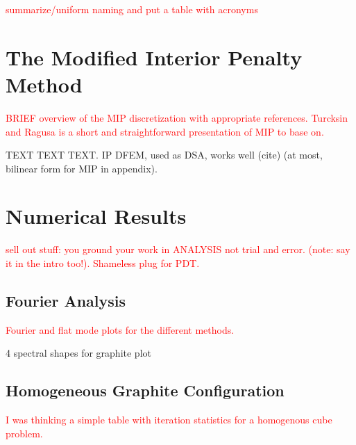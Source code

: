 \documentclass[preprint,10pt]{elsarticle}
\newcommand{\tcr}[1]{\textcolor{red}{#1}}
\begin{document}
\tcr{summarize/uniform naming and put a table with acronyms}

\section{The Modified Interior Penalty Method} \label{sec::MIP}

\tcr{BRIEF overview of the MIP discretization with appropriate references. Turcksin and Ragusa is a short and straightforward presentation of MIP to base on.}

TEXT TEXT TEXT. IP DFEM, used as DSA, works well (cite) (at most, bilinear form for MIP in appendix).

\section{Numerical Results} \label{sec::results}
\tcr{sell out stuff: you ground your work in ANALYSIS not trial and error. (note: say it in the intro too!). Shameless plug for PDT.}

\subsection{Fourier Analysis}
\tcr{Fourier and flat mode plots for the different methods.}


4 spectral shapes for graphite plot

\subsection{Homogeneous Graphite Configuration}
\tcr{I was thinking a simple table with iteration statistics for a homogenous cube problem.}
\end{document}
